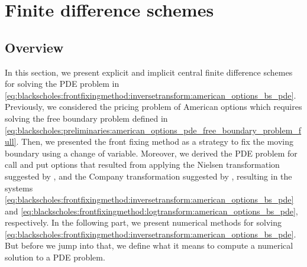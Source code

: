 \section{Finite difference schemes}

\subsection{Overview}

In this section, we present explicit and implicit central finite difference schemes for solving the PDE problem in \eqref{eq:blackscholes:frontfixingmethod:inversetransform:american_options_bs_pde}. Previously, we considered the pricing problem of American options which requires solving the free boundary problem defined in \eqref{eq:blackscholes:preliminaries:american_options_pde_free_boundary_problem_full}.
Then, we presented the front fixing method as a strategy to fix the moving boundary using a change of variable. Moreover, we derived the PDE problem for call and put options that resulted from applying the Nielsen transformation suggested by \cite{nielsen_2001}, and the Company transformation suggested by \cite{company_egorova_jodar_2014}, resulting in the systems \eqref{eq:blackscholes:frontfixingmethod:inversetransform:american_options_bs_pde} and \eqref{eq:blackscholes:frontfixingmethod:logtransform:american_options_bs_pde}, respectively. In the following part, we present numerical methods for solving \eqref{eq:blackscholes:frontfixingmethod:inversetransform:american_options_bs_pde}. But before we jump into that, we define what it means to compute a numerical solution to a PDE problem.

